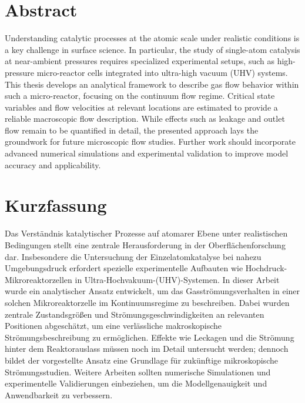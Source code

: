 \section*{Abstract}
Understanding catalytic processes at the atomic scale under realistic conditions is a key challenge in surface science.
In particular, the study of single-atom catalysis at near-ambient pressures requires specialized experimental setups, such as high-pressure micro-reactor cells integrated into ultra-high vacuum (UHV) systems.
This thesis develops an analytical framework to describe gas flow behavior within such a micro-reactor, focusing on the continuum flow regime.
Critical state variables and flow velocities at relevant locations are estimated to provide a reliable macroscopic flow description.
While effects such as leakage and outlet flow remain to be quantified in detail, the presented approach lays the groundwork for future microscopic flow studies.
Further work should incorporate advanced numerical simulations and experimental validation to improve model accuracy and applicability.
\blankpage

\section*{Kurzfassung}
Das Verständnis katalytischer Prozesse auf atomarer Ebene unter realistischen Bedingungen stellt eine zentrale Herausforderung in der Oberflächenforschung dar.
Insbesondere die Untersuchung der Einzelatomkatalyse bei nahezu Umgebungsdruck erfordert spezielle experimentelle Aufbauten wie Hochdruck-Mikroreaktorzellen in Ultra-Hochvakuum-(UHV)-Systemen.
In dieser Arbeit wurde ein analytischer Ansatz entwickelt, um das Gasströmungsverhalten in einer solchen Mikroreaktorzelle im Kontinuumsregime zu beschreiben.
Dabei wurden zentrale Zustandsgrößen und Strömungsgeschwindigkeiten an relevanten Positionen abgeschätzt, um eine verlässliche makroskopische Strömungsbeschreibung zu ermöglichen.
Effekte wie Leckagen und die Strömung hinter dem Reaktorauslass müssen noch im Detail untersucht werden; dennoch bildet der vorgestellte Ansatz eine Grundlage für zukünftige mikroskopische Strömungsstudien.
Weitere Arbeiten sollten numerische Simulationen und experimentelle Validierungen einbeziehen, um die Modellgenauigkeit und Anwendbarkeit zu verbessern.
\blankpage
